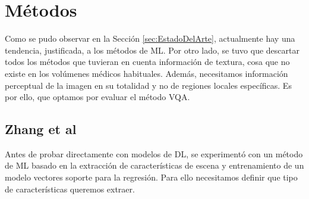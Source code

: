 \section{Métodos}
Como se pudo observar en la Sección \ref{sec:EstadoDelArte}, actualmente hay una 
tendencia, justificada, a los métodos de ML. Por otro lado, se tuvo 
que descartar todos los métodos que tuvieran en cuenta información de textura, 
cosa que no existe en los volúmenes médicos habituales. Además, necesitamos 
información perceptual de la imagen en su totalidad y no de regiones locales 
específicas. Es por ello, que optamos por evaluar el método VQA\cite{VQA-PC}.

\subsection{Zhang et al\cite{NR3DQA}}
\label{sec:NR3DQA}
Antes de probar directamente con modelos de DL, se experimentó con un método de 
ML basado en la extracción de características de escena y entrenamiento de un 
modelo vectores soporte para la regresión. Para ello necesitamos definir 
que tipo de características queremos extraer. 

